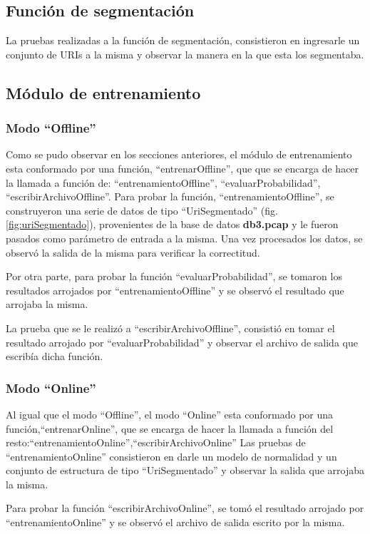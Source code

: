 \subsection*{Función de segmentación}

La pruebas realizadas a la función de segmentación, consistieron en ingresarle un conjunto de URIs a la misma y observar la manera en la que
esta los segmentaba.

\subsection*{Módulo de entrenamiento}
\subsubsection*{Modo ``Offline''}
Como se pudo observar en los secciones anteriores, el módulo de entrenamiento esta conformado por una función, ``entrenarOffline'', que que se
encarga de hacer la llamada a función de: ``entrenamientoOffline'', ``evaluarProbabilidad'', ``escribirArchivoOffline''.
Para probar la función, ``entrenamientoOffline'', se construyeron una serie de datos de tipo ``UriSegmentado'' (fig. \ref{fig:uriSegmentado}), provenientes de la base de datos \textbf{db3.pcap} y le fueron pasados como parámetro de entrada a la misma. Una vez procesados los datos, se observó la salida de la misma para verificar la correctitud.

Por otra parte, para probar la función ``evaluarProbabilidad'', se tomaron los resultados arrojados por ``entrenamientoOffline'' y se
observó el resultado que arrojaba la misma. 

La prueba que se le realizó a ``escribirArchivoOffline'', consistió en tomar el resultado arrojado por ``evaluarProbabilidad'' y observar el
archivo de salida que escribía dicha función. 

\subsubsection*{Modo ``Online''}
Al igual que el modo ``Offline'', el modo ``Online'' esta conformado por
una función,``entrenarOnline'', que se encarga de hacer la llamada a función
del resto:``entrenamientoOnline'',``escribirArchivoOnline''
Las pruebas de ``entrenamientoOnline'' consistieron en darle un modelo de normalidad y un conjunto de estructura
de tipo ``UriSegmentado'' y observar la salida que arrojaba la misma.

Para probar la función ``escribirArchivoOnline'', se tomó el resultado arrojado por ``entrenamientoOnline'' y se observó el archivo de salida escrito por la misma.

